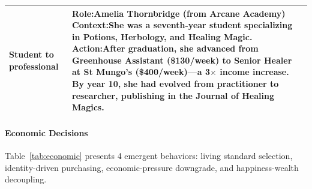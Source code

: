 \begin{table}[t]
\begin{tabular}{p{0.8in}p{4.3in}}
Student to \newline professional
&
\textbf{Role:}\quad Amelia Thornbridge \hfill (from Arcane Academy) \newline
\textbf{Context:}\quad She was a seventh-year student specializing in Potions, Herbology, and Healing Magic. \newline
\textbf{Action:}\quad After graduation, she advanced from Greenhouse Assistant (\$130/week) to \textbf{Senior Healer at St Mungo's (\$400/week)}---a 3$\times$ income increase. By year 10, she had evolved from practitioner to researcher, \textbf{publishing in the Journal of Healing Magics}.
\\
\bottomrule
\end{tabular}
\end{table}

\paragraph{Economic Decisions}
Table~\ref{tab:economic} presents 4 emergent behaviors:
living standard selection, identity-driven purchasing, economic-pressure downgrade, and happiness-wealth decoupling.

